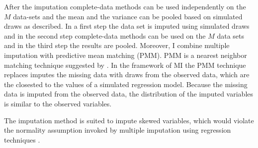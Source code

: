 \par
After the imputation complete-data methods can be used independently on the $M$ data-sets and the mean and the variance can be pooled based on simulated draws as described.
In a first step the data set is imputed using simulated draws and in the second step complete-data methods can be used on the $M$ data sets and in the third step the results are pooled.
 Moreover, I combine multiple imputation with predictive mean matching (PMM).
 PMM  is a nearest neighbor matching technique suggested by \textcite{Rubin_matching}.
In the framework of MI the PMM technique replaces imputes the missing data with draws from the observed data, which are the closested to the values of a simulated regression model.
Because the missing data is imputed from the observed data, the distribution of the imputed variables is similar to the observed variables. \par
The imputation method is suited to impute skewed variables, which would violate the normality assumption invoked by multiple imputation using regression techniques \parencite{White_MI_chained}.
